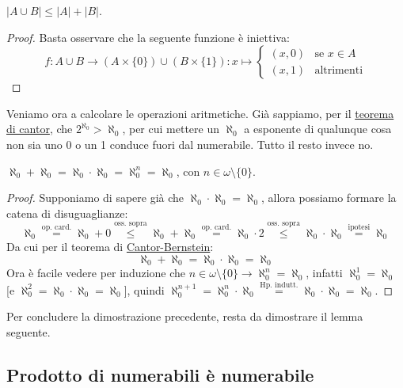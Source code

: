 \begin{remark}
	$|A \cup B| \leq |A| + |B|$.
\end{remark}

\begin{proof}
	Basta osservare che la seguente funzione è iniettiva:
	\[ f : A \cup B \to (A \times \{0\}) \cup (B \times \{1\}) : x \mapsto \begin{cases}
		(x,0) &\text{se $x \in A$} \\
		(x,1) &\text{altrimenti}
	\end{cases}
		\]
\end{proof}

Veniamo ora a calcolare le operazioni aritmetiche. Già sappiamo, per il \hyperref[cantor]{teorema di cantor}, 
che $2^{\aleph_0} > \aleph_0$, per cui mettere un $\aleph_0$ a esponente di qualunque cosa non sia uno 0 o un 1 conduce fuori dal numerabile.
Tutto il resto invece no.

\begin{proposition}
	$\aleph_0 + \aleph_0 = \aleph_0 \cdot \aleph_0 = \aleph_0^{n} = \aleph_0$, con $n \in \omega\setminus\{0\}$.
\end{proposition}

\begin{proof}
	Supponiamo di sapere già che $\aleph_0 \cdot \aleph_0 = \aleph_0$, allora possiamo formare la catena di disuguaglianze:
	\[ \aleph_0 \overset{\text{op. card.}}{=} \aleph_0 + 0 \overset{\text{oss. sopra}}{\leq} \aleph_0 + \aleph_0 \overset{\text{op. card.}}{=} \aleph_0 \cdot 2 \overset{\text{oss. sopra}}{\leq} \aleph_0 \cdot \aleph_0 \overset{\text{ipotesi}}{=} \aleph_0
		\]
	Da cui per il teorema di \hyperref[CB]{Cantor-Bernstein}:
	\[ \aleph_0 + \aleph_0 = \aleph_0 \cdot \aleph_0 = \aleph_0
		\]
	Ora è facile vedere per induzione che $n \in \omega \setminus\{0\} \rightarrow \aleph_0^n = \aleph_0 $, infatti $\aleph_0^1 = \aleph_0$ [e $\aleph_0^2 = \aleph_0 \cdot \aleph_0 = \aleph_0$], quindi $\aleph_0^{n+1} = \aleph_0^n \cdot \aleph_0 \overset{\text{Hp. indutt.}}{=} \aleph_0 \cdot \aleph_ 0 = \aleph_0$.
\end{proof}

Per concludere la dimostrazione precedente, resta da dimostrare il lemma seguente.

\subsection{Prodotto di numerabili è numerabile}

